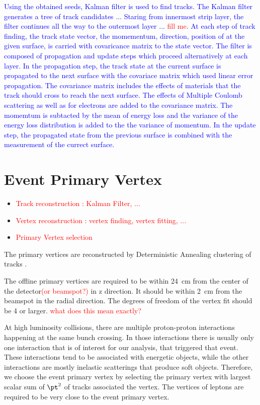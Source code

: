 \textcolor{blue}{ 
Using the obtained seeds, Kalman filter \cite{} is used to find tracks. 
The Kalman filter generates a tree of track candidates ... 
Staring from innermost strip layer, the filter continues all the way to the 
outermost layer ... \textcolor{red}{fill me}.
At each step of track finding, the track state vector, 
the momementum, direction, position of at the given surface, is carried 
with covaricance matrix to the state vector. 
The filter is composed of propagation and update steps which proceed 
alternatively at each layer. In the propagation step, the track state 
at the current surface is propagated to the next surface with the covariace 
matrix which used linear error propagation. The covariance matrix includes 
the effects of materials that the track should cross to reach the next surface. 
The effects of Multiple Coulomb scattering as well as \brem{} for electrons 
are added to the covariance matrix. The momemtum is subtacted by the mean of energy 
loss and the variance of the energy loss distribution is added to the the variance 
of momentum.  In the update step, the propagated state from the previous surface 
is combined with the measurement of the currect surface. 
}


\section{ Event Primary Vertex }
\begin{itemize}
\item \textcolor{red}{Track reconstruction : Kalman Filter, ...}
\item \textcolor{red}{Vertex reconstruction : vertex finding, vertex fitting, ...}
\item \textcolor{red}{Primary Vertex selection}
\end{itemize}

The primary vertices are reconstructed by Deterministic Annealing clustering of 
tracks \cite{davertex}.

The offline primary vertices are required to be within 24~cm from the center of the 
detector\textcolor{red}{(or beamspot?)} in z direction. 
It should be within 2~cm from the beamspot in the radial direction. 
The degrees of freedom of the vertex fit should be 4 or larger. 
\textcolor{red}{what does this mean exactly?} 

At high luminosity collisions, there are multiple proton-proton interactions 
happening at the same bunch crossing. In those interactions there is usually 
only one interaction that is of interest for our analysis, that triggered that event. 
These interactions tend to be associated with energetic objects, 
while the other interactions are mostly inelastic scatterings that produce soft objects.
Therefore, we choose the event primary vertex by selecting the primary vertex 
with largest scalar sum of $\pt^2$ of tracks associated the vertex. 
The vertices of leptons are required to be very close to the event primary vertex.  



